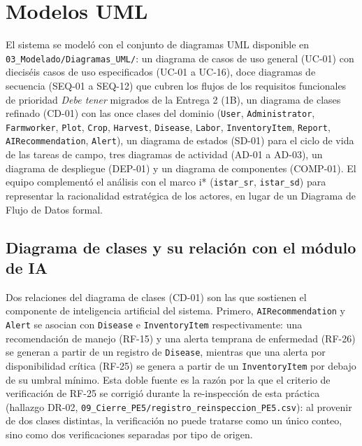 \section{Modelos UML}
\label{sec:modelos-uml}

El sistema se modeló con el conjunto de diagramas UML disponible en
\texttt{03\_Modelado/Diagramas\_UML/}: un diagrama de casos de uso general (UC-01) con
dieciséis casos de uso especificados (UC-01 a UC-16), doce diagramas de secuencia
(SEQ-01 a SEQ-12) que cubren los flujos de los requisitos funcionales de prioridad
\emph{Debe tener} migrados de la Entrega 2 (1B), un diagrama de clases refinado (CD-01) con
las once clases del dominio (\texttt{User}, \texttt{Administrator}, \texttt{Farmworker},
\texttt{Plot}, \texttt{Crop}, \texttt{Harvest}, \texttt{Disease}, \texttt{Labor},
\texttt{InventoryItem}, \texttt{Report}, \texttt{AIRecommendation}, \texttt{Alert}), un
diagrama de estados (SD-01) para el ciclo de vida de las tareas de campo, tres diagramas de
actividad (AD-01 a AD-03), un diagrama de despliegue (DEP-01) y un diagrama de componentes
(COMP-01). El equipo complementó el análisis con el marco i* (\texttt{istar\_sr},
\texttt{istar\_sd}) para representar la racionalidad estratégica de los actores, en lugar de un
Diagrama de Flujo de Datos formal.

\subsection{Diagrama de clases y su relación con el módulo de IA}
\label{sec:cd01-interpretacion}

Dos relaciones del diagrama de clases (CD-01) son las que sostienen el componente de
inteligencia artificial del sistema. Primero, \texttt{AIRecommendation} y \texttt{Alert} se
asocian con \texttt{Disease} e \texttt{InventoryItem} respectivamente: una recomendación de
manejo (RF-15) y una alerta temprana de enfermedad (RF-26) se generan a partir de un registro de
\texttt{Disease}, mientras que una alerta por disponibilidad crítica (RF-25) se genera a partir de
un \texttt{InventoryItem} por debajo de su umbral mínimo. Esta doble fuente es la razón por la que
el criterio de verificación de RF-25 se corrigió durante la re-inspección de esta práctica
(hallazgo DR-02, \texttt{09\_Cierre\_PE5/registro\_reinspeccion\_PE5.csv}): al provenir de dos
clases distintas, la verificación no puede tratarse como un único conteo, sino como dos
verificaciones separadas por tipo de origen.

